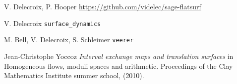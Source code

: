 \documentclass{article}
\begin{document}
%
%
%
%

\begin{thebibliography}{sage-flatsurf}

V. Delecroix, P. Hooper
\url{https://github.com/videlec/sage-flatsurf}

V. Delecroix
\texttt{surface\_dynamics}

M. Bell, V. Delecroix, S. Schleimer
\texttt{veerer}

Jean-Christophe Yoccoz
\textit{Interval exchange maps and translation surfaces}
in Homogeneous flows, moduli spaces and arithmetic.
Proceedings of the Clay Mathematics Institute summer school,
(2010).
\end{thebibliography}
\end{document}
